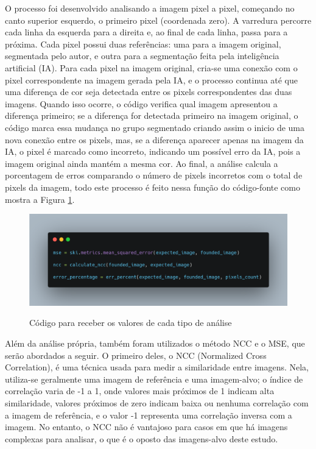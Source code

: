 O processo foi desenvolvido analisando a imagem pixel a pixel, começando no canto superior esquerdo, o primeiro pixel (coordenada zero). A varredura percorre cada linha da esquerda para a direita e, ao final de cada linha, passa para a próxima. Cada pixel possui duas referências: uma para a imagem original, segmentada pelo autor, e outra para a segmentação feita pela inteligência artificial (IA). Para cada pixel na imagem original, cria-se uma conexão com o pixel correspondente na imagem gerada pela IA, e o processo continua até que uma diferença de cor seja detectada entre os pixels correspondentes das duas imagens. Quando isso ocorre, o código verifica qual imagem apresentou a diferença primeiro; se a diferença for detectada primeiro na imagem original, o código marca essa mudança no grupo segmentado criando assim o inicio de uma nova conexão entre os pixels, mas, se a diferença aparecer apenas na imagem da IA, o pixel é marcado como incorreto, indicando um possível erro da IA, pois a imagem original ainda mantém a mesma cor. Ao final, a análise calcula a porcentagem de erros comparando o número de pixels incorretos com o total de pixels da imagem, todo este processo é feito nessa função do código-fonte como mostra a Figura \ref{fig:code3}.

\FloatBarrier
\begin{figure}[ht]
    \caption{Código para receber os valores de cada tipo de análise}
    \centering
    \includegraphics[scale=0.25]{imagens/code_part_three.png}
    \label{fig:code3}
\end{figure}
\FloatBarrier

Além da análise própria, também foram utilizados o método NCC e o MSE, que serão abordados a seguir. O primeiro deles, o NCC (Normalized Cross Correlation), é uma técnica usada para medir a similaridade entre imagens. Nela, utiliza-se geralmente uma imagem de referência e uma imagem-alvo; o índice de correlação varia de -1 a 1, onde valores mais próximos de 1 indicam alta similaridade, valores próximos de zero indicam baixa ou nenhuma correlação com a imagem de referência, e o valor -1 representa uma correlação inversa com a imagem. No entanto, o NCC não é vantajoso para casos em que há imagens complexas para analisar, o que é o oposto das imagens-alvo deste estudo.

